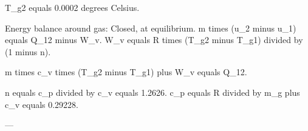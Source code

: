 T_g2 equals 0.0002 degrees Celsius.  

Energy balance around gas: Closed, at equilibrium.  
m times (u_2 minus u_1) equals Q_12 minus W_v.  
W_v equals R times (T_g2 minus T_g1) divided by (1 minus n).  

m times c_v times (T_g2 minus T_g1) plus W_v equals Q_12.  

n equals c_p divided by c_v equals 1.2626.  
c_p equals R divided by m_g plus c_v equals 0.29228.  

---